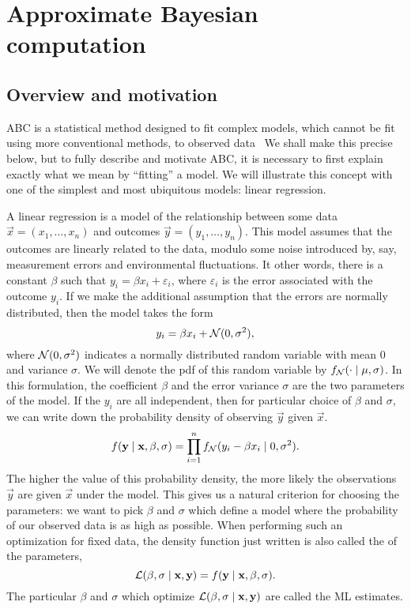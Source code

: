 \section{Approximate Bayesian computation}

\label{sec:abc}

\subsection{Overview and motivation}

\Gls{ABC} is a statistical method designed to fit complex models, which cannot
be fit using more conventional methods, to observed
data~\autocite{marin2012approximate, sunnaker2013approximate,
beaumont2010approximate} We shall make this precise below, but to fully
describe and motivate \gls{ABC}, it is necessary to first explain exactly what
we mean by ``fitting'' a model. We will illustrate this concept with one of the
simplest and most ubiquitous models: linear regression.

A linear regression is a model of the relationship between some data $\vec{x} =
(x_1, \ldots, x_n)$ and outcomes $\vec{y} = (y_1, \ldots, y_n)$. This model
assumes that the outcomes are linearly related to the data, modulo some noise
introduced by, say, measurement errors and environmental fluctuations. It other
words, there is a constant $\beta$ such that $y_i = \beta x_i + \varepsilon_i$,
where $\varepsilon_i$ is the error associated with the outcome $y_i$. If we
make the additional assumption that the errors are normally distributed, then
the model takes the form
\[
  y_i = \beta x_i + \mathcal{N}(0, \sigma^2),
\]
where $\mathcal{N}(0, \sigma^2)$ indicates a normally distributed random variable with
mean 0 and variance $\sigma$. We will denote the \gls{pdf} of this random
variable by $f_{\mathcal{N}}(\cdot \mid \mu, \sigma)$. In this formulation, the
coefficient $\beta$ and the error variance $\sigma$ are the two parameters of
the model. If the $y_i$ are all independent, then for particular choice of
$\beta$ and $\sigma$, we can write down the probability density of observing
$\vec{y}$ given $\vec{x}$.
\[
  f(\mathbf{y} \mid \mathbf{x}, \beta, \sigma) = 
  \prod_{i=1}^n f_{\mathcal{N}}(y_i - \beta x_i \mid 0, \sigma^2).
\]
The higher the value of this probability density, the more likely the
observations $\vec{y}$ are given $\vec{x}$ under the model. This gives us a
natural criterion for choosing the parameters: we want to pick $\beta$ and
$\sigma$ which define a model where the probability of our observed data is as
high as possible. When performing such an optimization for fixed data, the
density function just written is also called the  of the
parameters,
\[
  \mathcal{L}(\beta, \sigma \mid \mathbf{x}, \mathbf{y}) = f(\mathbf{y} \mid \mathbf{x}, \beta, \sigma).
\]
The particular $\beta$ and $\sigma$ which optimize $\mathcal{L}(\beta, \sigma \mid
\mathbf{x}, \mathbf{y})$ are called the \gls{ML} estimates. 

